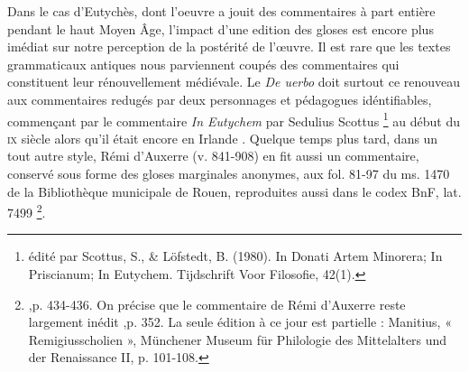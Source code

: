 \documentclass[a4paper, twoside, 12pt]{book}
\begin{document}
Dans le cas d'Eutychès, dont l'oeuvre a jouit des commentaires à part entière pendant le haut Moyen Âge, l'impact d'une edition des gloses est encore plus imédiat sur notre perception de la postérité de l'œuvre. Il est rare que les textes grammaticaux antiques nous parviennent coupés des commentaires qui constituent leur \og{} rénouvellement \fg{} médiévale. Le \textit{De uerbo} doit surtout ce renouveau aux commentaires redugés par deux personnages et pédagogues idéntifiables, commençant par le commentaire \textit{In Eutychem} par Sedulius Scottus \footnote{édité par Scottus, S., \& Löfstedt, B. (1980). In Donati Artem Minorera; In Priscianum; In Eutychem. Tijdschrift Voor Filosofie, 42(1).} au début du \textsc{ix}\ieme{} siècle  alors qu’il était encore en Irlande . Quelque temps plus tard, dans un tout autre style, Rémi d’Auxerre (v. 841-908) en fit aussi un commentaire, conservé sous forme des gloses marginales anonymes, aux fol. 81-97 du ms. 1470 de la Bibliothèque municipale de Rouen, reproduites aussi dans le codex  BnF, lat. 7499 \footnote{\cite{jeudy1974manuscrits},p. 434-436. On précise que le commentaire de Rémi d'Auxerre reste largement inédit \cite{zetzel2018critics},p. 352. La seule édition à ce jour est partielle : Manitius, « Remigiusscholien »,
Münchener Museum für Philologie des Mittelalters und der Renaissance II, p. 101-108.}.\\
\end{document}
